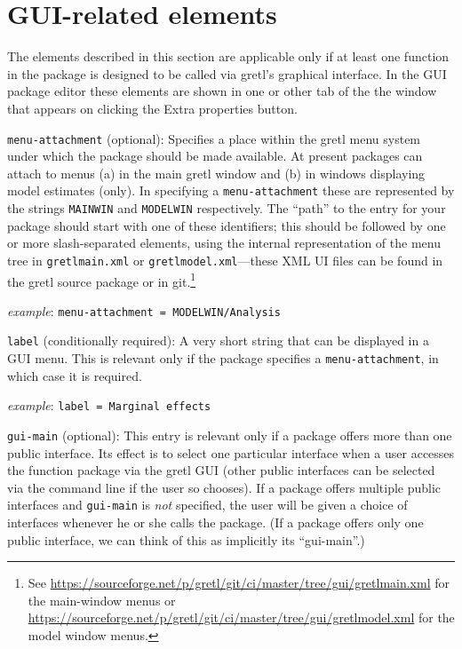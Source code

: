 \documentclass[oneside]{book}
\newcommand{\ttusage}[1]{\textit{example}: \quad \texttt{#1}}
\begin{document}
\section{GUI-related elements}
\label{sec:spec-gui}

The elements described in this section are applicable only if at least
one function in the package is designed to be called via gretl's
graphical interface. In the GUI package editor these elements are
shown in one or other tab of the the window that appears on clicking
the \textsf{Extra properties} button.

\begin{description}

\item \texttt{menu-attachment} (optional): Specifies a place within
  the gretl menu system under which the package should be made
  available. At present packages can attach to menus (a) in the main
  gretl window and (b) in windows displaying model estimates
  (only). In specifying a \texttt{menu-attachment} these are
  represented by the strings \texttt{MAINWIN} and \texttt{MODELWIN}
  respectively. The ``path'' to the entry for your package should
  start with one of these identifiers; this should be followed by one
  or more slash-separated elements, using the internal representation
  of the menu tree in \texttt{gretlmain.xml} or
  \texttt{gretlmodel.xml}---these XML UI files can be found in the
  gretl source package or in git.\footnote{See
    \url{https://sourceforge.net/p/gretl/git/ci/master/tree/gui/gretlmain.xml}
    for the main-window menus or
    \url{https://sourceforge.net/p/gretl/git/ci/master/tree/gui/gretlmodel.xml}
    for the model window menus.}

  \ttusage{menu-attachment = MODELWIN/Analysis}

\item \texttt{label} (conditionally required): A very short string
  that can be displayed in a GUI menu. This is relevant only if the
  package specifies a \texttt{menu-attachment}, in which case it is
  required.

  \ttusage{label = Marginal effects}

\item \texttt{gui-main} (optional): This entry is relevant only if a
  package offers more than one public interface. Its effect is to
  select one particular interface when a user accesses the function
  package via the gretl GUI (other public interfaces can be selected
  via the command line if the user so chooses). If a package offers
  multiple public interfaces and \texttt{gui-main} is \textit{not}
  specified, the user will be given a choice of interfaces whenever he
  or she calls the package. (If a package offers only one public
  interface, we can think of this as implicitly its ``gui-main''.)


\end{description}
\end{document}
